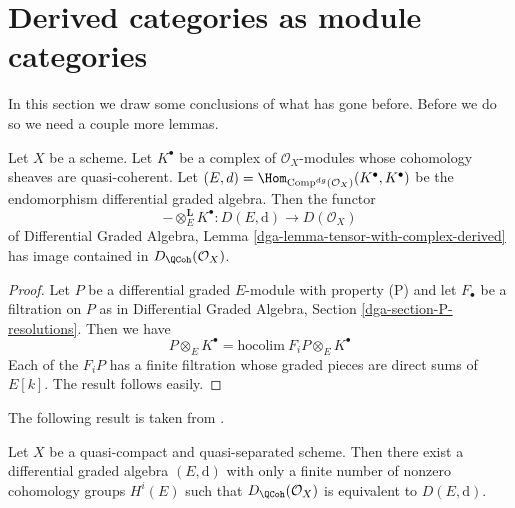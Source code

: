 \section{Derived categories as module categories}
\label{section-derived-is-dga}

\noindent
In this section we draw some conclusions of what has gone before.
Before we do so we need a couple more lemmas.

\begin{lemma}
\label{lemma-tensor-with-QCoh-complex}
Let $X$ be a scheme. Let $K^\bullet$ be a complex of $\mathcal{O}_X$-modules
whose cohomology sheaves are quasi-coherent. Let
$(E, d) = \Hom_{\text{Comp}^{dg}(\mathcal{O}_X)}(K^\bullet, K^\bullet)$
be the endomorphism differential graded algebra. Then the functor
$$
- \otimes_E^\mathbf{L} K^\bullet :
D(E, \text{d}) \longrightarrow D(\mathcal{O}_X)
$$
of
Differential Graded Algebra, Lemma
\ref{dga-lemma-tensor-with-complex-derived}
has image contained in $D_\QCoh(\mathcal{O}_X)$.
\end{lemma}

\begin{proof}
Let $P$ be a differential graded $E$-module with property (P)
and let $F_\bullet$ be a filtration on $P$ as in
Differential Graded Algebra, Section \ref{dga-section-P-resolutions}.
Then we have
$$
P \otimes_E K^\bullet = \text{hocolim}\ F_iP \otimes_E K^\bullet
$$
Each of the $F_iP$ has a finite filtration whose graded pieces
are direct sums of $E[k]$. The result follows easily.
\end{proof}

\noindent
The following result is taken from \cite{BvdB}.

\begin{theorem}
\label{theorem-DQCoh-is-Ddga}
Let $X$ be a quasi-compact and quasi-separated scheme.
Then there exist a differential graded algebra $(E, \text{d})$
with only a finite number of nonzero cohomology groups $H^i(E)$
such that $D_\QCoh(\mathcal{O}_X)$ is equivalent
to $D(E, \text{d})$.
\end{theorem}

